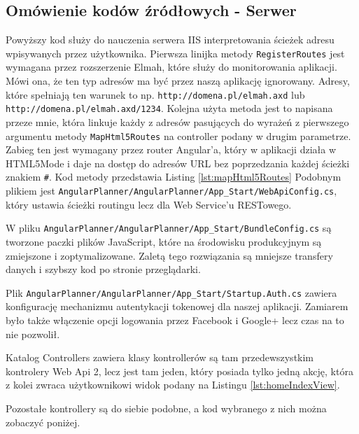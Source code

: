 \documentclass[10pt,titlepage]{article}
\begin{document}
\subsection{Omówienie kodów źródłowych - Serwer}
\lstset{style=sharpc}

\par Powyższy kod służy do nauczenia serwera IIS interpretowania ścieżek adresu wpisywanych przez użytkownika. Pierwsza linijka metody \verb|RegisterRoutes| jest wymagana przez rozszerzenie Elmah, które służy do monitorowania aplikacji. Mówi ona, że ten typ adresów ma być przez naszą aplikację ignorowany. Adresy, które spełniają ten warunek to np. \verb|http://domena.pl/elmah.axd| lub \verb|http://domena.pl/elmah.axd/1234|. Kolejna użyta metoda jest to napisana przeze mnie, która linkuje każdy z adresów pasujących do wyrażeń z pierwszego argumentu metody \verb|MapHtml5Routes| na controller podany w drugim parametrze. Zabieg ten jest wymagany przez router Angular'a, który w aplikacji działa w HTML5Mode i daje na dostęp do adresów URL bez poprzedzania każdej ścieżki znakiem \verb|#|. Kod metody przedstawia Listing \ref{lst:mapHtml5Routes} Podobnym plikiem jest \verb|AngularPlanner/AngularPlanner/App_Start/WebApiConfig.cs|, który ustawia ścieżki routingu lecz dla Web Service'u RESTowego.

\par W pliku \verb|AngularPlanner/AngularPlanner/App_Start/BundleConfig.cs| są tworzone paczki plików JavaScript, które na środowisku produkcyjnym są zmiejszone i zoptymalizowane. Zaletą tego rozwiązania są mniejsze transfery danych i szybszy kod po stronie przeglądarki.\par Plik \verb|AngularPlanner/AngularPlanner/App_Start/Startup.Auth.cs| zawiera konfigurację mechanizmu autentykacji tokenowej dla naszej aplikacji. Zamiarem było także włączenie opcji logowania przez Facebook i Google+ lecz czas na to nie pozwolił.\par Katalog Controllers zawiera klasy kontrollerów są tam przedewszystkim kontrolery Web Api 2, lecz jest tam jeden, który posiada tylko jedną akcję, która z kolei zwraca użytkownikowi widok podany na Listingu \ref{lst:homeIndexView}.

\par Pozostałe kontrollery są do siebie podobne, a kod wybranego z nich można zobaczyć poniżej.
\end{document}
